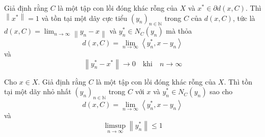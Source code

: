 \begin{lemma}
    Giả định rằng $C$ là một tập con lồi đóng khác rỗng của $X$ và $x^* \in \partial d(x, C)$. Thì $\left \| x^* \right \| = 1$ và tồn tại một dãy cực tiểu $(y_n)_{n \in \mathbb{N}}$ trong $C$ của $d(x, C)$, tức là $d(x, C) = \lim_{n \rightarrow \infty}\left \| y_n - x \right \|$ và $y_n^* \in N_C(y_n)$ mà thỏa
    \begin{equation}
        d(x, C) = \lim_{n \rightarrow \infty}\left \langle y^*_n, x - y_n \right \rangle
    \end{equation}
    và
    \begin{equation}
        \left \| y_n^* - x^* \right \| \rightarrow 0 \quad\text{khi}\quad n \rightarrow \infty
    \end{equation}
\end{lemma}

\begin{lemma}
    Cho $x \in X$. Giả định rằng $C$ là một tập con lồi đóng khác rỗng của $X$. Thì tồn tại một dãy nhỏ nhất $(y_n)_{n \in \mathbb{N}}$ trong $C$ với $x$ và $y^*_n \in N_C(y_n)$ sao cho
    \begin{equation}
        d(x, C) = \lim_{n \rightarrow \infty}\left \langle y^*_n, x - y_n \right \rangle
    \end{equation}
    và
    \begin{equation}
        \limsup_{n \rightarrow \infty} \left \| y_n^* \right \| \leq 1
    \end{equation}
\end{lemma}